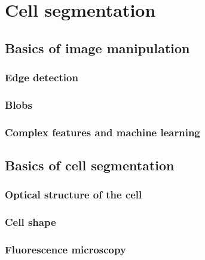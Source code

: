 
\chapter{Cell segmentation}

\ifpdf
    \graphicspath{{Chapter2/Figs/Raster/}{Chapter2/Figs/PDF/}{Chapter2/Figs/}}
\else
    \graphicspath{{Chapter2/Figs/Vector/}{Chapter2/Figs/}}
\fi

\section{Basics of image manipulation}

\subsection{Edge detection}

\subsection{Blobs}

\subsection{Complex features and machine learning}

\section{Basics of cell segmentation}

\subsection{Optical structure of the cell}

\subsection{Cell shape}

\subsection{Fluorescence microscopy}

